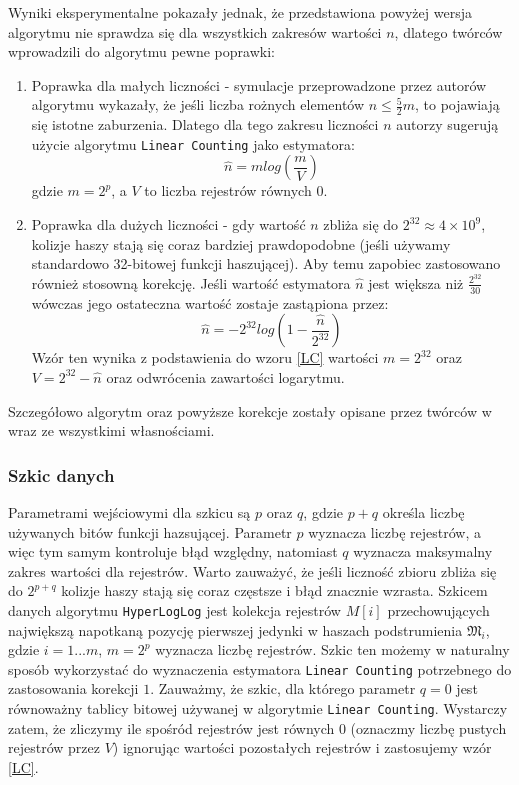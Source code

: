 Wyniki eksperymentalne pokazały jednak, że przedstawiona powyżej wersja algorytmu nie sprawdza się dla wszystkich zakresów wartości $n$, dlatego twórców wprowadzili do algorytmu pewne poprawki:
\begin{enumerate}
    \item Poprawka dla małych liczności - symulacje przeprowadzone przez autorów algorytmu wykazały, że jeśli liczba rożnych elementów $n \le \frac{5}{2}m$, 
    to pojawiają się istotne zaburzenia. Dlatego dla tego zakresu liczności $n$ autorzy sugerują użycie  algorytmu \texttt{Linear Counting} \cite{linear} jako estymatora:
    \begin{equation}
    \hat{n} = {m}log(\frac{m}{V})
    \label{LC}
    \end{equation}
    gdzie $m = 2^p$, a $V$ to liczba rejestrów równych $0$.
    
    \item Poprawka dla dużych liczności - gdy wartość $n$ zbliża się do $2^{32} \approx 4 \times 10^9$, kolizje haszy stają się coraz bardziej prawdopodobne (jeśli używamy standardowo 32-bitowej funkcji haszującej). Aby temu zapobiec zastosowano również stosowną korekcję. Jeśli wartość estymatora $\hat{n}$ jest większa niż $\frac{2^{32}}{30}$ wówczas jego ostateczna wartość zostaje zastąpiona przez:
    \begin{equation}
	    \hat{n} = {-2}^{32}log(1 - \frac{\hat{n}}{2^{32}})
    \end{equation}
    Wzór ten wynika z podstawienia do wzoru \ref{LC} wartości $m = 2^{32}$ oraz $V = 2^{32} - \hat{n}$ oraz odwrócenia zawartości logarytmu.
\end{enumerate}
Szczegółowo algorytm oraz powyższe korekcje zostały opisane przez twórców w \cite{hll} wraz ze wszystkimi własnościami.

\subsubsection{Szkic danych}
\label{HLL_sketch}
Parametrami wejściowymi dla szkicu są $p$ oraz $q$, gdzie $p + q$ określa liczbę używanych bitów funkcji hazsującej. Parametr $p$ wyznacza liczbę rejestrów, a więc tym samym kontroluje błąd względny, natomiast $q$ wyznacza maksymalny zakres wartości dla rejestrów. Warto zauważyć, że jeśli liczność zbioru zbliża się do $2^{p+q}$ kolizje haszy stają się coraz częstsze i błąd znacznie wzrasta. 
Szkicem danych algorytmu \texttt{HyperLogLog} jest kolekcja rejestrów $M[i]$ przechowujących największą napotkaną pozycję pierwszej jedynki w haszach podstrumienia $\mathfrak{M}_i$, gdzie $i = 1 ... m$, $m = 2^p$ wyznacza liczbę rejestrów. Szkic ten możemy w naturalny sposób wykorzystać do wyznaczenia estymatora \texttt{Linear Counting} potrzebnego do zastosowania korekcji $1.$ Zauważmy, że szkic, dla którego parametr $q = 0$ jest równoważny tablicy bitowej używanej w algorytmie \texttt{Linear Counting}. Wystarczy zatem, że zliczymy ile spośród rejestrów jest równych $0$ (oznaczmy liczbę pustych rejestrów przez $V$) ignorując wartości pozostałych rejestrów i zastosujemy wzór \ref{LC}.

